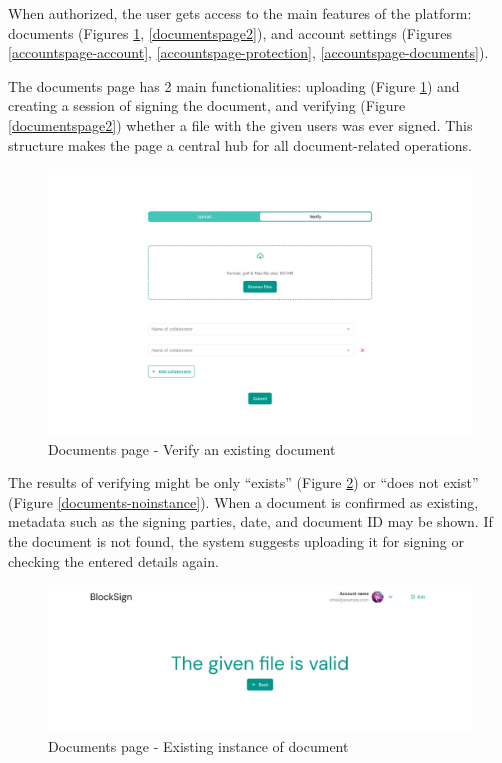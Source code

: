 \newpage
When authorized, the user gets access to the main features of the platform: documents (Figures \ref{documentspage1}, \ref{documentspage2}), and account settings (Figures \ref{accountspage-account}, \ref{accountspage-protection}, \ref{accountspage-documents}).

The documents page has 2 main functionalities: uploading (Figure \ref{documentspage1}) and creating a session of signing the document, and verifying (Figure \ref{documentspage2}) whether a file with the given users was ever signed. 
This structure makes the page a central hub for all document-related operations. 

\begin{figure}[H]
    \centering
    \includegraphics[width=18cm]{"images/figmaUI/documentspage1-crop.png"}
    \caption{Documents page - Verify an existing document}
    \label{documentspage1}
\end{figure}

The results of verifying might be only ``exists'' (Figure \ref{documents-exists}) or ``does not exist'' (Figure \ref{documents-noinstance}). 
When a document is confirmed as existing, metadata such as the signing parties, date, and document ID may be shown. 
If the document is not found, the system suggests uploading it for signing or checking the entered details again.

\begin{figure}[H]
    \centering
    \includegraphics[width=18cm]{"images/figmaUI/success-crop.png"}
    \caption{Documents page - Existing instance of document}
    \label{documents-exists}
\end{figure}

